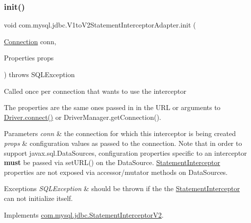 \subsubsection{\texorpdfstring{init()}{init()}}
{\footnotesize\ttfamily void com.\+mysql.\+jdbc.\+V1to\+V2\+Statement\+Interceptor\+Adapter.\+init (\begin{DoxyParamCaption}\item[{\mbox{\hyperlink{interfacecom_1_1mysql_1_1jdbc_1_1_connection}{Connection}}}]{conn,  }\item[{Properties}]{props }\end{DoxyParamCaption}) throws S\+Q\+L\+Exception}

Called once per connection that wants to use the interceptor

The properties are the same ones passed in in the U\+RL or arguments to \mbox{\hyperlink{classcom_1_1mysql_1_1jdbc_1_1_non_registering_driver_a834c012e752a01d1ee435b3461bb8218}{Driver.\+connect()}} or Driver\+Manager.\+get\+Connection().


\begin{DoxyParams}{Parameters}
{\em conn} & the connection for which this interceptor is being created \\
\hline
{\em props} & configuration values as passed to the connection. Note that in order to support javax.\+sql.\+Data\+Sources, configuration properties specific to an interceptor {\bfseries must} be passed via set\+U\+R\+L() on the Data\+Source. \mbox{\hyperlink{interfacecom_1_1mysql_1_1jdbc_1_1_statement_interceptor}{Statement\+Interceptor}} properties are not exposed via accessor/mutator methods on Data\+Sources.\\
\hline
\end{DoxyParams}

\begin{DoxyExceptions}{Exceptions}
{\em S\+Q\+L\+Exception} & should be thrown if the the \mbox{\hyperlink{interfacecom_1_1mysql_1_1jdbc_1_1_statement_interceptor}{Statement\+Interceptor}} can not initialize itself. \\
\hline
\end{DoxyExceptions}


Implements \mbox{\hyperlink{interfacecom_1_1mysql_1_1jdbc_1_1_statement_interceptor_v2_ae2d3d924826dcf4a4e025433af0b4d8f}{com.\+mysql.\+jdbc.\+Statement\+Interceptor\+V2}}.

